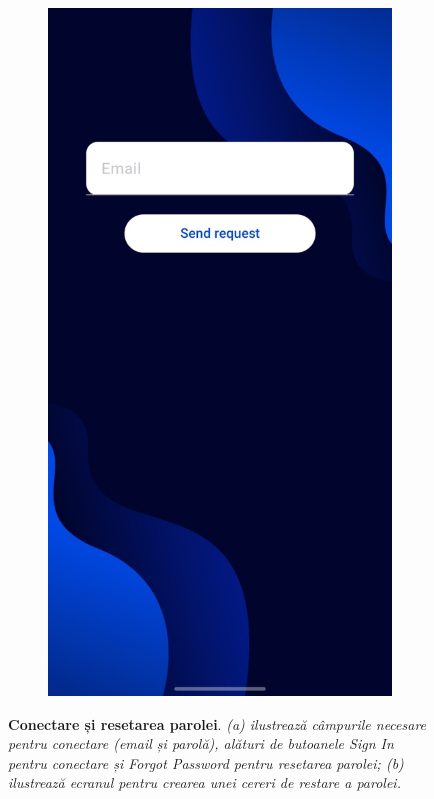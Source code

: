 \begin{figure}[H]
\begin{subfigure}{0.2\textwidth}
  \end{subfigure}
  \begin{subfigure}{0.2\textwidth}
    \includegraphics[width=\linewidth]{images/3-aplicatia-android/forgot_pass_screen.jpeg}
    \caption{}
    \label{fig:forgot_password}
  \end{subfigure}
  \caption[Conectare și resetarea parolei]{\textbf{Conectare și resetarea parolei}. \textit{(a) ilustrează câmpurile necesare pentru conectare (email și parolă), alături de butoanele Sign In pentru conectare și Forgot Password pentru resetarea parolei; (b) ilustrează ecranul pentru crearea unei cereri de restare a parolei.}}
  \label{fig:sign_up_validation_screens}
\end{figure}

